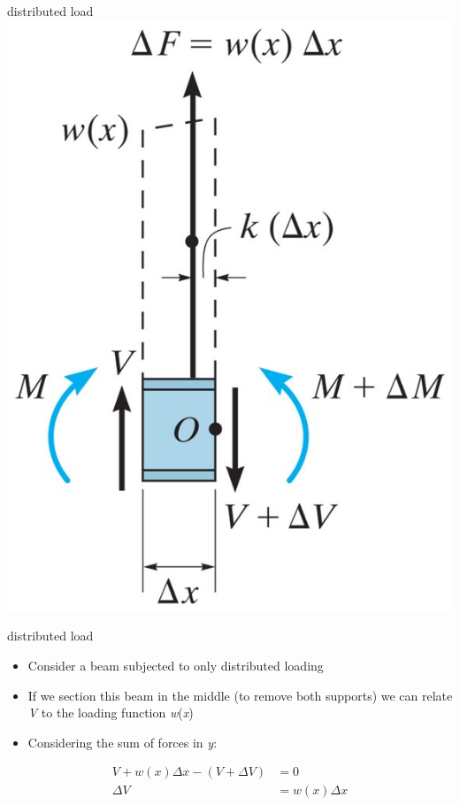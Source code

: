 \begin{frame}{distributed load}
\protect\hypertarget{distributed-load}{}
\includegraphics{../images/distributed-load.jpg}
\end{frame}

\begin{frame}{distributed load}
\protect\hypertarget{distributed-load-1}{}
\begin{itemize}
\tightlist
\item
  Consider a beam subjected to only distributed loading
\item
  If we section this beam in the middle (to remove both supports) we can
  relate \emph{V} to the loading function \emph{w}(\emph{x})
\item
  Considering the sum of forces in \emph{y}:
\end{itemize}

\[\begin{aligned}
  V + w(x)\Delta x - (V + \Delta V) &= 0\\
  \Delta V &= w(x) \Delta x
\end{aligned}\]
\end{frame}

